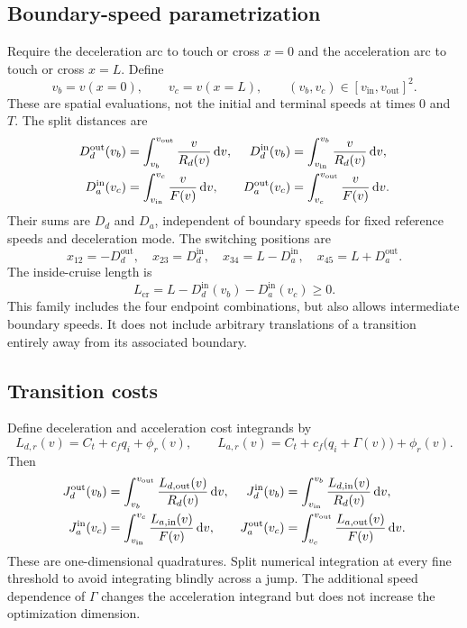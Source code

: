 \documentclass[10pt,a4paper]{article}
\newcommand{\dd}{\,\mathrm{d}}
\newcommand{\out}{\mathrm{out}}
\newcommand{\inn}{\mathrm{in}}
\newcommand{\cruise}{\mathrm{cr}}
\begin{document}
\subsection{Boundary-speed parametrization}
Require the deceleration arc to touch or cross $x=0$ and the acceleration arc to touch or cross $x=L$. Define
\begin{equation}
v_b=v(x=0),\qquad v_c=v(x=L),\qquad
(v_b,v_c)\in[v_{\inn},v_{\out}]^2.
\end{equation}
These are spatial evaluations, not the initial and terminal speeds at times 0 and $T$. The split distances are
\begin{align}
D_d^{\out}(v_b)&=\int_{v_b}^{v_{\out}}\frac{v}{R_d(v)}\dd v,&
D_d^{\inn}(v_b)&=\int_{v_{\inn}}^{v_b}\frac{v}{R_d(v)}\dd v,\notag\\
D_a^{\inn}(v_c)&=\int_{v_{\inn}}^{v_c}\frac{v}{F(v)}\dd v,&
D_a^{\out}(v_c)&=\int_{v_c}^{v_{\out}}\frac{v}{F(v)}\dd v.
\label{eq:splitdist}
\end{align}
Their sums are $D_d$ and $D_a$, independent of boundary speeds for fixed reference speeds and deceleration mode. The switching positions are
\begin{equation}
x_{12}=-D_d^{\out},\quad x_{23}=D_d^{\inn},\quad
x_{34}=L-D_a^{\inn},\quad x_{45}=L+D_a^{\out}.
\label{eq:switchpositions}
\end{equation}
The inside-cruise length is
\begin{equation}
L_{\cruise}=L-D_d^{\inn}(v_b)-D_a^{\inn}(v_c)\ge0.
\label{eq:feasibility}
\end{equation}
This family includes the four endpoint combinations, but also allows intermediate boundary speeds. It does not include arbitrary translations of a transition entirely away from its associated boundary.

\subsection{Transition costs}
Define deceleration and acceleration cost integrands by
\begin{equation}
L_{d,r}(v)=C_t+c_fq_i+\phi_r(v),\qquad
L_{a,r}(v)=C_t+c_f\bigl(q_i+\Gamma(v)\bigr)+\phi_r(v).
\end{equation}
Then
\begin{align}
J_d^{\out}(v_b)&=\int_{v_b}^{v_{\out}}\frac{L_{d,\out}(v)}{R_d(v)}\dd v,&
J_d^{\inn}(v_b)&=\int_{v_{\inn}}^{v_b}\frac{L_{d,\inn}(v)}{R_d(v)}\dd v,\notag\\
J_a^{\inn}(v_c)&=\int_{v_{\inn}}^{v_c}\frac{L_{a,\inn}(v)}{F(v)}\dd v,&
J_a^{\out}(v_c)&=\int_{v_c}^{v_{\out}}\frac{L_{a,\out}(v)}{F(v)}\dd v.
\label{eq:splitcost}
\end{align}
These are one-dimensional quadratures. Split numerical integration at every fine threshold to avoid integrating blindly across a jump. The additional speed dependence of $\Gamma$ changes the acceleration integrand but does not increase the optimization dimension.
\end{document}
